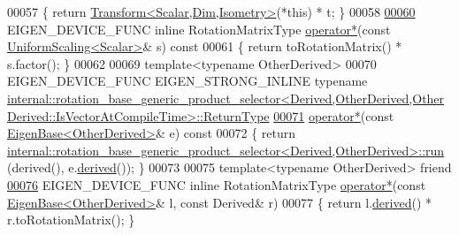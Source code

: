 \begin{DoxyCode}
00057 \textcolor{keyword}{    }\{ \textcolor{keywordflow}{return} \hyperlink{group___geometry___module_class_eigen_1_1_transform}{Transform<Scalar,Dim,Isometry>}(*this) * t; \}
00058 
\hyperlink{class_eigen_1_1_rotation_base_ad7b31a12a4f8f2584b8937f958bd6ea6}{00060}     EIGEN\_DEVICE\_FUNC \textcolor{keyword}{inline} RotationMatrixType \hyperlink{class_eigen_1_1_rotation_base_ad7b31a12a4f8f2584b8937f958bd6ea6}{operator*}(\textcolor{keyword}{const} 
      \hyperlink{class_eigen_1_1_uniform_scaling}{UniformScaling<Scalar>}& s)\textcolor{keyword}{ const}
00061 \textcolor{keyword}{    }\{ \textcolor{keywordflow}{return} toRotationMatrix() * s.factor(); \}
00062 
00069     \textcolor{keyword}{template}<\textcolor{keyword}{typename} OtherDerived>
00070     EIGEN\_DEVICE\_FUNC EIGEN\_STRONG\_INLINE \textcolor{keyword}{typename} 
      \hyperlink{struct_eigen_1_1internal_1_1rotation__base__generic__product__selector}{
      internal::rotation\_base\_generic\_product\_selector<Derived,OtherDerived,OtherDerived::IsVectorAtCompileTime>::ReturnType}
\hyperlink{class_eigen_1_1_rotation_base_a68d8b53d31bcfa9fd6b0e24a061bea6c}{00071}     \hyperlink{class_eigen_1_1_rotation_base_a68d8b53d31bcfa9fd6b0e24a061bea6c}{operator*}(\textcolor{keyword}{const} \hyperlink{group___core___module_struct_eigen_1_1_eigen_base}{EigenBase<OtherDerived>}& e)\textcolor{keyword}{ const}
00072 \textcolor{keyword}{    }\{ \textcolor{keywordflow}{return} 
      \hyperlink{struct_eigen_1_1internal_1_1rotation__base__generic__product__selector}{internal::rotation\_base\_generic\_product\_selector<Derived,OtherDerived>::run}
      (derived(), e.\hyperlink{group___core___module_a324b16961a11d2ecfd2d1b7dd7946545}{derived}()); \}
00073 
00075     \textcolor{keyword}{template}<\textcolor{keyword}{typename} OtherDerived> \textcolor{keyword}{friend}
\hyperlink{class_eigen_1_1_rotation_base_affba3749838de939140b601e7db834e8}{00076}     EIGEN\_DEVICE\_FUNC \textcolor{keyword}{inline} RotationMatrixType \hyperlink{class_eigen_1_1_rotation_base_affba3749838de939140b601e7db834e8}{operator*}(\textcolor{keyword}{const} 
      \hyperlink{group___core___module_struct_eigen_1_1_eigen_base}{EigenBase<OtherDerived>}& l, \textcolor{keyword}{const} Derived& r)
00077     \{ \textcolor{keywordflow}{return} l.\hyperlink{group___core___module_a324b16961a11d2ecfd2d1b7dd7946545}{derived}() * r.toRotationMatrix(); \}

\end{DoxyCode}
